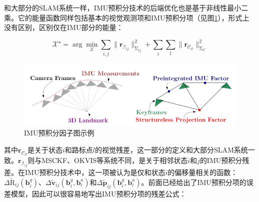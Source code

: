 和大部分的SLAM系统一样，IMU预积分技术的后端优化也是基于非线性最小二乘。它的能量函数同样包括基本的视觉观测项和IMU预积分项（见图\ref{fig:preint}），形式上没有区别，区别仅在IMU部分的能量：

\begin{equation}\label{eq:gtsam_res}
    \bm{\mathcal X}^\star =
        \arg\mathop{\min}_{\bm{\mathcal X}}
        \sum_{i,j}\lVert \mathbf{r}_{\mathcal{I}_{ij}} \rVert^2_{\mathrm\Sigma_{ij}} +
        \sum_{i} \sum_{l} \lVert \mathbf{r}_{\mathcal{C}_{il}} \rVert^2_{\mathrm\Sigma_{C}}
\end{equation}

\begin{figure}[htb]
    \centering
    \includegraphics[width=.8\textwidth]{./figs/preint.png}
    \caption{IMU预积分因子图示例\citep{forster2017manifold}}
    \label{fig:preint}
\end{figure}

其中$\mathbf{r}_{\mathcal{C}_{il}}$是关于状态$i$和路标点$l$的视觉残差，这一部分的定义和大部分SLAM系统一致。$\mathbf{r}_{\mathcal{I}_{ij}}$则与MSCKF、OKVIS等系统不同，是关于相邻状态$i$和$j$的IMU预积分残差。在IMU预积分技术中，这一项被认为是仅和状态$i$的偏移量相关的函数：$\Delta\tilde{\mathrm R}_{ij}(\mathbf{b}^g_i)$、$\Delta\tilde{\mathbf v}_{ij}(\mathbf{b}^g_i, \mathbf{b}^a_i)$和$\Delta\tilde{\mathbf p}_{ij}(\mathbf{b}^g_i, \mathbf{b}^a_i)$。前面已经给出了IMU预积分项的误差模型，因此可以很容易地写出IMU预积分项的残差公式：

